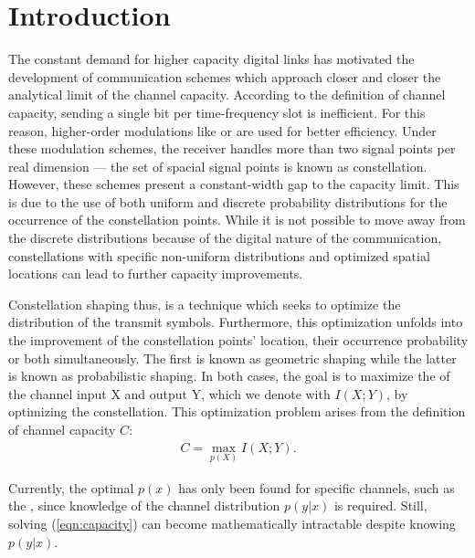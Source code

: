 \chapter{Introduction}\label{chap:introduction}

The constant demand for higher capacity digital links has motivated the development of communication schemes which approach closer and closer the analytical limit of the channel capacity. According to the definition of channel capacity, sending a single bit per time-frequency slot is inefficient. For this reason, higher-order modulations like  or  are used for better efficiency. Under these modulation schemes, the receiver handles more than two signal points per real dimension --- the set of spacial signal points is known as constellation. However, these schemes present a constant-width gap to the capacity limit. This is due to the use of both uniform and discrete probability distributions for the occurrence of the constellation points. While it is not possible to move away from the discrete distributions because of the digital nature of the communication, constellations with specific non-uniform distributions and optimized spatial locations can lead to further capacity improvements. 

Constellation shaping thus, is a technique which seeks to optimize the distribution of the transmit symbols. Furthermore, this optimization unfolds into the improvement of the constellation points' location, their occurrence probability or both simultaneously. The first is known as geometric shaping while the latter is known as probabilistic shaping. In both cases, the goal is to maximize the  of the channel input X and output Y, which we denote with $I(X;Y)$, by optimizing the constellation. This optimization problem arises from the definition of channel capacity $C$:
\begin{align}
\label{eqn:capacity}
	C = \max_{p(X)} I(X;Y).
\end{align}

Currently, the optimal $p(x)$ has only been found for specific channels, such as the , since knowledge of the channel distribution $p(y|x)$ is required. Still, solving (\ref{eqn:capacity}) can become mathematically intractable despite knowing $p(y|x)$.

